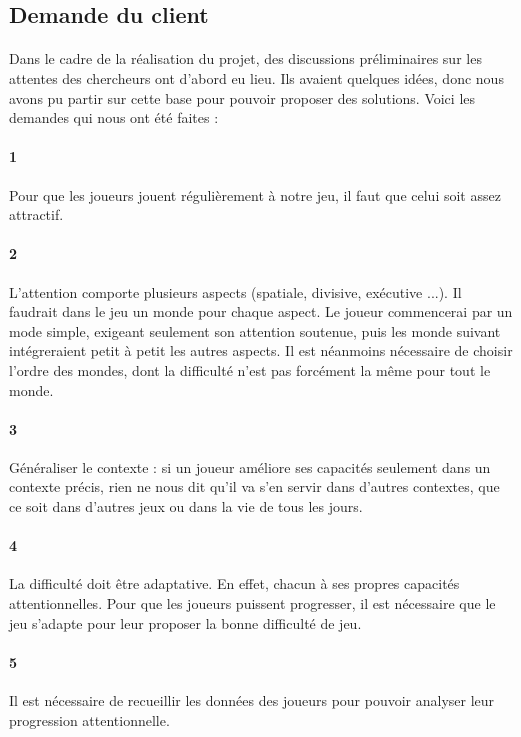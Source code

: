 \subsection{Demande du client}

\paragraph{}Dans le cadre de la réalisation du projet, des discussions préliminaires sur les attentes des chercheurs ont d'abord eu lieu. Ils avaient quelques idées, donc nous avons
pu partir sur cette base pour pouvoir proposer des solutions. Voici les demandes qui nous ont été faites :


\paragraph{1}Pour que les joueurs jouent régulièrement à notre jeu, il faut que celui soit assez attractif.
\paragraph{2}L'attention comporte plusieurs aspects (spatiale, divisive, exécutive ...). Il faudrait dans le jeu un monde pour chaque aspect. Le joueur commencerai par un mode simple,
exigeant seulement son attention soutenue, puis les monde suivant intégreraient petit à petit les autres aspects. Il est néanmoins nécessaire de choisir l'ordre des mondes, dont la
difficulté n'est pas forcément la même pour tout le monde.
\paragraph{3}Généraliser le contexte : si un joueur améliore ses capacités seulement dans un contexte précis, rien ne nous dit qu'il va s'en servir dans d'autres contextes, que ce soit
dans d'autres jeux ou dans la vie de tous les jours.
\paragraph{4}La difficulté doit être adaptative. En effet, chacun à ses propres capacités attentionnelles. Pour que les joueurs puissent progresser, il est nécessaire que le jeu s'adapte pour
leur proposer la bonne difficulté de jeu.
\paragraph{5}Il est nécessaire de recueillir les données des joueurs pour pouvoir analyser leur progression attentionnelle.

